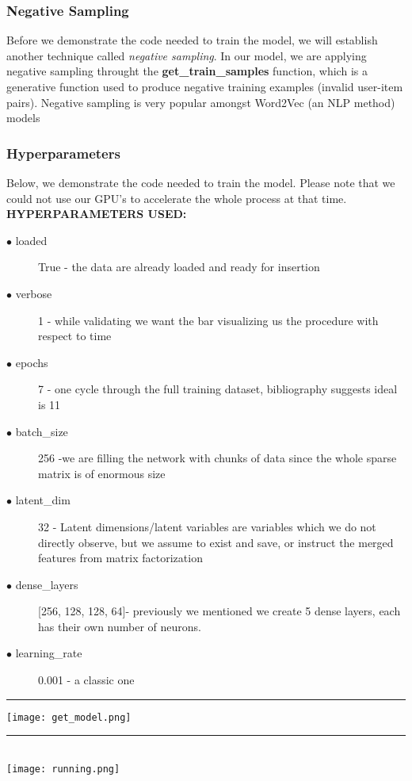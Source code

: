 \documentclass[]{article}
\begin{document}
\subsubsection{Negative Sampling}
Before we demonstrate the code needed to train the model, we will establish another technique called \textit{negative sampling}. In our model, we are applying negative sampling throught the  \textbf{get\_train\_samples} function, which is a generative function used to produce negative training examples (invalid user-item pairs). Negative sampling is very popular amongst Word2Vec (an NLP method) models \cite{1}

\subsubsection{Hyperparameters}
Below, we demonstrate the code needed to train the model. Please note that we could not use our GPU's to accelerate the whole process at that time. \textbf{HYPERPARAMETERS USED:} \begin{description}
	\item [$\bullet$ loaded] True - the data are already loaded and ready for insertion
	\item [$\bullet$ verbose] 1 - while validating we want the bar visualizing us the procedure with respect to time
	\item [$\bullet$ epochs] 7 - one cycle through the full training dataset, bibliography suggests ideal is 11
	\item [$\bullet$ batch\_size] 256 -we are filling the network with chunks of data since the whole sparse matrix is of enormous size
	\item [$\bullet$ latent\_dim] 32 - Latent dimensions/latent variables are variables which we do not directly observe, but we assume to exist and save, or instruct the merged features from matrix factorization 
	\item [$\bullet$ dense\_layers] [256, 128, 128, 64]- previously we mentioned we create 5 dense layers, each has their own number of neurons.
	\item [$\bullet$ learning\_rate] 0.001 - a classic one
\end{description}

\noindent
{\color{Blue} \rule{\linewidth}{0.5mm}}
\texttt{[image: get\_model.png]}
\noindent
{\color{Blue} \rule{\linewidth}{0.5mm}}
\\
\texttt{[image: running.png]}
\end{document}
